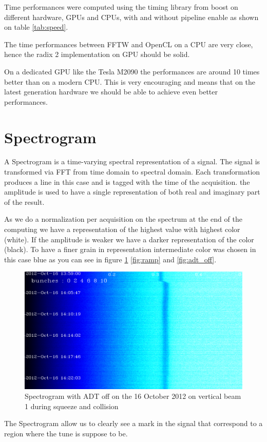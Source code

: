	Time performances were computed using the timing library from boost \cite{boost} on different hardware, \glspl{GPU} and \glspl{CPU}, with and without pipeline enable as shown on table \ref{tab:speed}.

	The time performances between \gls{FFTW} and \gls{OpenCL} on a \gls{CPU} are very close, hence the radix 2 implementation on \gls{GPU} should be solid.

	On a dedicated \gls{GPU} like the Tesla M2090  the performances are around 10 times better than on a modern \gls{CPU}. This is very encouraging and means that on the latest generation hardware we should be able to achieve even better performances.
	
\section{Spectrogram}
\label{sec:spectrogram}

A Spectrogram is a time-varying spectral representation of a signal. The signal is transformed via \gls{FFT} from time domain to spectral domain. Each transformation produces a line in this case and is tagged with the time of the acquisition. the amplitude is used to have a single representation of both real and imaginary part of the result.

As we do a normalization per acquisition on the spectrum at the end of the computing we have a representation of the highest value with highest color (white). If the amplitude is weaker we have a darker representation of the color (black). To have a finer grain in representation intermediate color was chosen in this case blue as you can see in figure \ref{fig:squeeze} \ref{fig:ramp} and \ref{fig:adt_off}.

\begin{figure}[H]
	\caption{Spectrogram with ADT off on the 16 October 2012 on vertical beam 1 during squeeze and collision}
	\label{fig:squeeze}
	\centering
	\includegraphics[scale=0.3]{md-121016-vb1-m1-6bunches-10acc-1359-1425-collision.pdf}
\end{figure}

The Spectrogram allow us to clearly see a mark in the signal that correspond to a region where the tune is suppose to be.